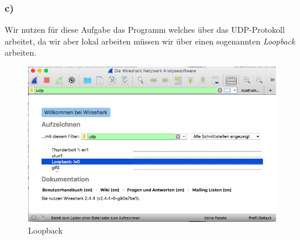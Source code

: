 \subsubsection{c)}
Wir nutzen für diese Aufgabe das Programm welches über das UDP-Protokoll arbeitet, da wir aber lokal arbeiten müssen wir über einen sogenannten \textit{Loopback} arbeiten.
\begin{figure}[H]
	\centering
	\includegraphics[width=0.7 \linewidth]{images/w05}
	\caption{Loopback} \label{ordner}
\end{figure} 

